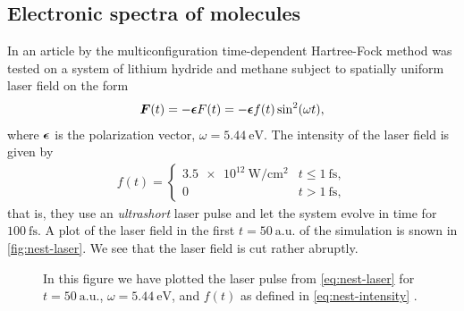         \subsection{Electronic spectra of molecules}
            In an article by \citeauthor{nest} \cite{nest} the
            multiconfiguration time-dependent Hartree-Fock method was tested on
            a system of lithium hydride and methane subject to spatially uniform
            laser field on the form
            \begin{align}
                \boldsymbol{F}(t)
                = -\boldsymbol{\epsilon} F(t)
                = -\boldsymbol{\epsilon}
                f(t) \sin^2(\omega t),
                \label{eq:nest-laser}
            \end{align}
            where $\boldsymbol{\epsilon}$ is the polarization vector, $\omega =
            \SI{5.44}{\electronvolt}$.
            The intensity of the laser field is given by
            \begin{align}
                f(t) = \begin{cases}
                    \SI{3.5e12}{\watt/\cm^2}
                    & t \leq \SI{1}{\femto\second}, \\
                    0 & t > \SI{1}{\femto\second},
                \end{cases}
                \label{eq:nest-intensity}
            \end{align}
            that is, they use an \emph{ultrashort} laser pulse and let the
            system evolve in time for $\SI{100}{\femto\second}$.
            A plot of the laser field in the first $t = \SI{50}{\text{a.u.}}$ of
            the simulation is snown in \autoref{fig:nest-laser}.
            We see that the laser field is cut rather abruptly.
            \begin{figure}
                \centering
                \caption{In this figure we have plotted the laser pulse from
                \autoref{eq:nest-laser} for $t = \SI{50}{\text{a.u.}}$,
                $\omega = \SI{5.44}{\electronvolt}$, and $f(t)$ as defined in
                \autoref{eq:nest-intensity} \cite{nest}.}
                \label{fig:nest-laser}
            \end{figure}
